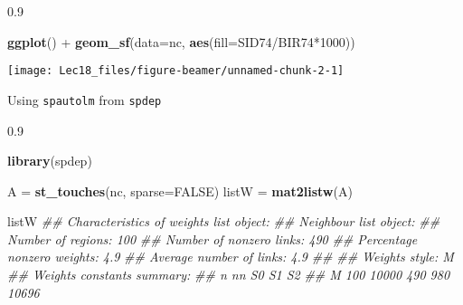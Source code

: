 \documentclass[11pt,ignorenonframetext,]{beamer}
\newenvironment{Shaded}{}{}
\newcommand{\CommentTok}[1]{\textcolor[rgb]{0.38,0.63,0.69}{\textit{#1}}}
\newcommand{\DataTypeTok}[1]{\textcolor[rgb]{0.56,0.13,0.00}{#1}}
\newcommand{\DecValTok}[1]{\textcolor[rgb]{0.25,0.63,0.44}{#1}}
\newcommand{\KeywordTok}[1]{\textcolor[rgb]{0.00,0.44,0.13}{\textbf{#1}}}
\newcommand{\NormalTok}[1]{#1}
\newcommand{\OperatorTok}[1]{\textcolor[rgb]{0.40,0.40,0.40}{#1}}
\newcommand{\OtherTok}[1]{\textcolor[rgb]{0.00,0.44,0.13}{#1}}
\newcommand{\StringTok}[1]{\textcolor[rgb]{0.25,0.44,0.63}{#1}}
\let\oldShaded\Shaded
\let\endoldShaded\endShaded
\renewenvironment{Shaded}{\footnotesize\begin{spacing}{0.9}\oldShaded}{\endoldShaded\end{spacing}}
\begin{document}
\begin{frame}[fragile]{}
\protect\hypertarget{section}{}

\begin{Shaded}
\begin{Highlighting}[]
\KeywordTok{ggplot}\NormalTok{() }\OperatorTok{+}\StringTok{ }\KeywordTok{geom_sf}\NormalTok{(}\DataTypeTok{data=}\NormalTok{nc, }\KeywordTok{aes}\NormalTok{(}\DataTypeTok{fill=}\NormalTok{SID74}\OperatorTok{/}\NormalTok{BIR74}\OperatorTok{*}\DecValTok{1000}\NormalTok{))}
\end{Highlighting}
\end{Shaded}

\begin{center}\texttt{[image: Lec18\_files/figure-beamer/unnamed-chunk-2-1]} \end{center}

\end{frame}

\begin{frame}[fragile,t]{Using \texttt{spautolm} from \texttt{spdep}}
\protect\hypertarget{using-spautolm-from-spdep}{}

\begin{Shaded}
\begin{Highlighting}[]
\KeywordTok{library}\NormalTok{(spdep)}

\NormalTok{A =}\StringTok{ }\KeywordTok{st_touches}\NormalTok{(nc, }\DataTypeTok{sparse=}\OtherTok{FALSE}\NormalTok{)}
\NormalTok{listW =}\StringTok{ }\KeywordTok{mat2listw}\NormalTok{(A)}

\NormalTok{listW}
\CommentTok{## Characteristics of weights list object:}
\CommentTok{## Neighbour list object:}
\CommentTok{## Number of regions: 100 }
\CommentTok{## Number of nonzero links: 490 }
\CommentTok{## Percentage nonzero weights: 4.9 }
\CommentTok{## Average number of links: 4.9 }
\CommentTok{## }
\CommentTok{## Weights style: M }
\CommentTok{## Weights constants summary:}
\CommentTok{##     n    nn  S0  S1    S2}
\CommentTok{## M 100 10000 490 980 10696}
\end{Highlighting}
\end{Shaded}

\end{frame}
\end{document}
